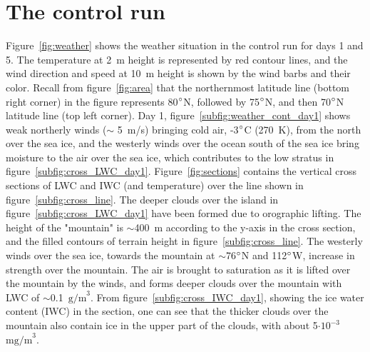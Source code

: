 \section{The control run}
Figure~\ref{fig:weather} shows the weather situation in the control run for days 1 and 5. The temperature at 2~m height is represented by red contour lines, and the wind direction and speed at 10~m height is shown by the 
wind barbs and their color. Recall from figure~\ref{fig:area} that the northernmost latitude line (bottom right corner) in the figure represents 80$\degree$N, followed by 75$\degree$N, and then 70$\degree$N latitude line (top left corner). Day 1, figure~\ref{subfig:weather_cont_day1} shows weak northerly winds ($\sim$ 5~m/s) bringing cold air, -3$\degree$C (270~K), from the north over the sea ice, and the westerly winds over the ocean south of the sea ice bring moisture to the air over the sea ice, which contributes to the low stratus in figure~\ref{subfig:cross_LWC_day1}. Figure~\ref{fig:sections} contains the vertical cross sections of LWC and IWC (and temperature) over the line shown in figure~\ref{subfig:cross_line}. The deeper clouds over the island in figure~\ref{subfig:cross_LWC_day1} have been formed due to orographic lifting. The height of the "mountain" is $\sim$400~m according to the y-axis in the cross section, and the filled contours of terrain height in figure~\ref{subfig:cross_line}. The westerly winds over the sea ice, towards the mountain at $\sim$76$\degree$N and 112$\degree$W, increase in strength over the mountain. The air is brought to saturation as it is lifted over the mountain by the winds, and forms deeper clouds over the mountain with LWC of $\sim$0.1~$\text{g/m}^3$.  From figure~\ref{subfig:cross_IWC_day1}, showing the ice water content (IWC) in the section, one can see that the thicker clouds over the mountain also contain ice in the upper part of the clouds, with about 5$\cdot\text{10}^{-3}$~$\text{mg/m}^3$. 

